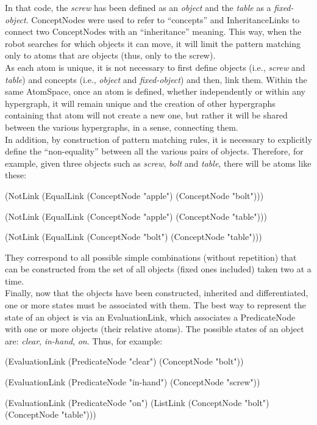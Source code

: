 In that code, the \textit{screw} has been defined as an \textit{object} and the \textit{table} as a \textit{fixed-object}. 
ConceptNodes were used to refer to \enquote{concepts} and InheritanceLinks to connect two ConceptNodes with an \enquote{inheritance} meaning. This way, when the robot searches for which objects it can move, it will limit the pattern matching only to atoms that are objects (thus, only to the screw). \\
As each atom is unique, it is not necessary to first define objects (i.e., \textit{screw} and \textit{table}) and concepts (i.e., \textit{object} and \textit{fixed-object}) and then, link them. Within the same AtomSpace, once an atom is defined, whether independently or within any hypergraph, it will remain unique and the creation of other hypergraphs containing that atom will not create a new one, but rather it will be shared between the various hypergraphs, in a sense, connecting them. \\

In addition, by construction of pattern matching rules, it is necessary to explicitly define the \enquote{non-equality} between all the various pairs of objects. Therefore, for example, given three objects such as \textit{screw}, \textit{bolt} and \textit{table}, there will be atoms like these: \\
\begin{python}
	(NotLink (EqualLink 
		(ConceptNode "apple") (ConceptNode "bolt")))

	(NotLink (EqualLink 
		(ConceptNode "apple") (ConceptNode "table")))

	(NotLink (EqualLink 
		(ConceptNode "bolt") (ConceptNode "table")))
\end{python}
They correspond to all possible simple combinations (without repetition) that can be constructed from the set of all objects (fixed ones included) taken two at a time. \\

Finally, now that the objects have been constructed, inherited and differentiated, one or more states must be associated with them. The best way to represent the state of an object is via an EvaluationLink, which associates a PredicateNode with one or more objects (their relative atoms). The possible states of an object are: \textit{clear}, \textit{in-hand}, \textit{on}. Thus, for example: \\
\begin{python}
	(EvaluationLink
		(PredicateNode "clear")
		(ConceptNode "bolt"))
	
	(EvaluationLink
		(PredicateNode "in-hand")
		(ConceptNode "screw"))
	
	(EvaluationLink
		(PredicateNode "on")
		(ListLink
			(ConceptNode "bolt")
			(ConceptNode "table")))
\end{python}

